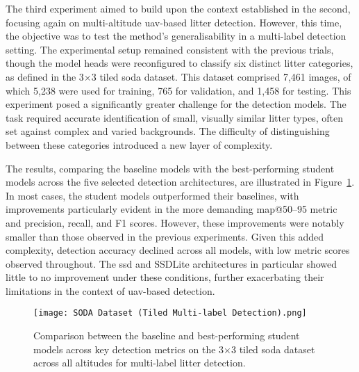 The third experiment aimed to build upon the context established in the second, focusing again on multi-altitude \gls{uav}-based litter detection. However, this time, the objective was to test the method’s generalisability in a multi-label detection setting. The experimental setup remained consistent with the previous trials, though the model heads were reconfigured to classify six distinct litter categories, as defined in the 3$\times$3 tiled \gls{soda} dataset. This dataset comprised 7,461 images, of which 5,238 were used for training, 765 for validation, and 1,458 for testing.
This experiment posed a significantly greater challenge for the detection models. The task required accurate identification of small, visually similar litter types, often set against complex and varied backgrounds. The difficulty of distinguishing between these categories introduced a new layer of complexity.

The results, comparing the baseline models with the best-performing student models across the five selected detection architectures, are illustrated in Figure~\ref{fig:soda_tiled_multi_bar}. In most cases, the student models outperformed their baselines, with improvements particularly evident in the more demanding \gls{map}@50–95 metric and precision, recall, and F1 scores. However, these improvements were notably smaller than those observed in the previous experiments. Given this added complexity, detection accuracy declined across all models, with low metric scores observed throughout. The \gls{ssd} and SSDLite architectures in particular showed little to no improvement under these conditions, further exacerbating their limitations in the context of \gls{uav}-based detection.

\begin{figure}[!ht]
    \centering
    \texttt{[image: SODA Dataset (Tiled Multi-label Detection).png]}
    \caption{Comparison between the baseline and best-performing student models across key detection metrics on the 3$\times$3 tiled \gls{soda} dataset across all altitudes for multi-label litter detection.}
    \label{fig:soda_tiled_multi_bar}
\end{figure}

